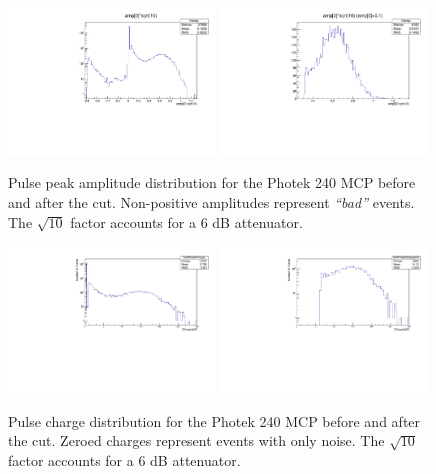 \documentclass[twocolumn,aps,prd,reprint,superscriptaddress,floatfix]{revtex4-1}
\begin{document}
\begin{figure}[!htb]
\centering
	\includegraphics[width=0.49\textwidth]{AmpCut0.pdf}
	\includegraphics[width=0.49\textwidth]{AmpCut1.pdf}
	\caption{Pulse peak amplitude distribution for the Photek 240 MCP before and after the cut.
		Non-positive amplitudes represent \textit{``bad''} events.
		The $\sqrt{10}$ factor accounts for a 6 dB attenuator.}
	\label{fig:AmpCut}
\end{figure}

\begin{figure}[!htb]
\centering
	\includegraphics[width=0.49\textwidth]{ChargeCut0.pdf}
	\includegraphics[width=0.49\textwidth]{ChargeCut1.pdf}
	\caption{Pulse charge distribution for the Photek 240 MCP before and after the cut.
		Zeroed charges represent events with only noise.
		The $\sqrt{10}$ factor accounts for a 6 dB attenuator.}
	\label{fig:ChargeCut}
\end{figure}
\end{document}
